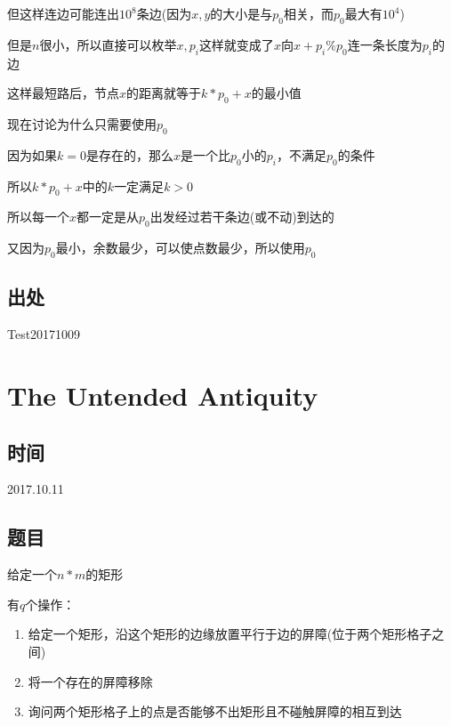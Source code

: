 \documentclass[a4paper]{article}
\begin{document}
		但这样连边可能连出$10^8$条边(因为$x,y$的大小是与$p_0$相关，而$p_0$最大有$10^4$)
		
		但是$n$很小，所以直接可以枚举$x,p_i$这样就变成了$x$向$x+p_i \% p_0$连一条长度为$p_i$的边
		
		这样最短路后，节点$x$的距离就等于$k * p_0 + x$的最小值
		
		现在讨论为什么只需要使用$p_0$
		
		因为如果$k=0$是存在的，那么$x$是一个比$p_0$小的$p_i$，不满足$p_0$的条件
		
		所以$k * p_0 + x$中的$k$一定满足$k > 0$
		
		所以每一个$x$都一定是从$p_0$出发经过若干条边(或不动)到达的
		
		又因为$p_0$最小，余数最少，可以使点数最少，所以使用$p_0$
		
	\subsection{出处}
		
		Test20171009
	
	\newpage
	
	\section{The Untended Antiquity}
		
	\subsection{时间}
		
		2017.10.11
		
	\subsection{题目}
		
		给定一个$n*m$的矩形
		
		有$q$个操作：
		
		\begin{enumerate}
		
			\item 给定一个矩形，沿这个矩形的边缘放置平行于边的屏障(位于两个矩形格子之间)
			
			\item 将一个存在的屏障移除
			
			\item 询问两个矩形格子上的点是否能够不出矩形且不碰触屏障的相互到达
			
		\end{enumerate}
		
\end{document}
